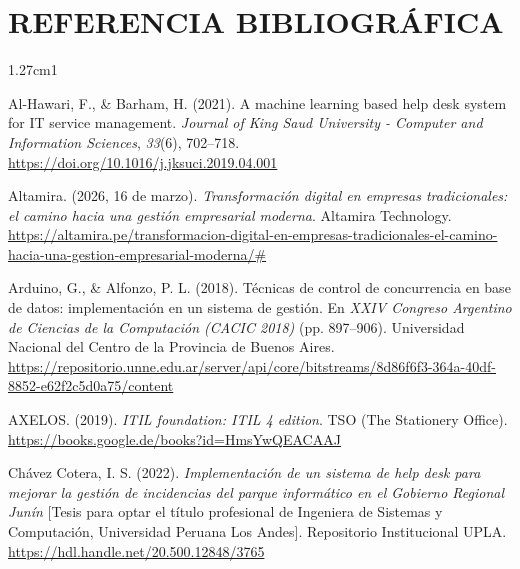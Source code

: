 \cleardoublepage
{}
\chapter*{REFERENCIA BIBLIOGRÁFICA}

\begin{hangparas}{1.27cm}{1}

Al-Hawari, F., \& Barham, H. (2021). A machine learning based help desk system for IT service management. \textit{Journal of King Saud University - Computer and Information Sciences}, \textit{33}(6), 702--718. \url{https://doi.org/10.1016/j.jksuci.2019.04.001}

\vspace{0.8em}

Altamira. (2026, 16 de marzo). \textit{Transformación digital en empresas tradicionales: el camino hacia una gestión empresarial moderna}. Altamira Technology. \url{https://altamira.pe/transformacion-digital-en-empresas-tradicionales-el-camino-hacia-una-gestion-empresarial-moderna/#}

\vspace{0.8em}

Arduino, G., \& Alfonzo, P. L. (2018). Técnicas de control de concurrencia en base de datos: implementación en un sistema de gestión. En \textit{XXIV Congreso Argentino de Ciencias de la Computación (CACIC 2018)} (pp. 897--906). Universidad Nacional del Centro de la Provincia de Buenos Aires. \url{https://repositorio.unne.edu.ar/server/api/core/bitstreams/8d86f6f3-364a-40df-8852-e62f2c5d0a75/content}

\vspace{0.8em}

AXELOS. (2019). \textit{ITIL foundation: ITIL 4 edition}. TSO (The Stationery Office). \url{https://books.google.de/books?id=HmsYwQEACAAJ}

\vspace{0.8em}

Chávez Cotera, I. S. (2022). \textit{Implementación de un sistema de help desk para mejorar la gestión de incidencias del parque informático en el Gobierno Regional Junín} [Tesis para optar el título profesional de Ingeniera de Sistemas y Computación, Universidad Peruana Los Andes]. Repositorio Institucional UPLA. \url{https://hdl.handle.net/20.500.12848/3765}

\vspace{0.8em}


\end{hangparas}
